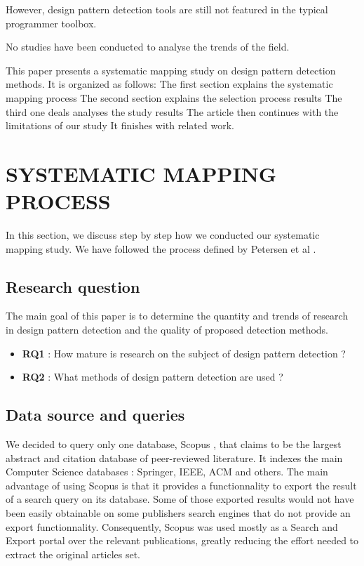 \documentclass[letterpaper, 10 pt, conference]{ieeeconf}  %
\begin{document}
However, design pattern detection tools are still not featured in the typical
programmer toolbox.

No studies have been conducted to analyse the trends of the field.

This paper presents a systematic mapping study on design pattern detection
methods.
It is organized as follows: 
 The first section explains the systematic mapping process
 The second section explains the selection process results
 The third one deals analyses the study results
 The article then continues with the limitations of our study
 It finishes with related work. 



\section{SYSTEMATIC MAPPING PROCESS}

In this section, we discuss step by step how we conducted our systematic
mapping study.
We have followed the process defined by Petersen et al \cite{c1}. 

\subsection{Research question}

The main goal of this paper is to determine the quantity and trends of research
in design pattern detection and the quality of proposed detection methods.

\begin{itemize}
	\item \textbf{RQ1} : How mature is research on the subject of design pattern detection ?
	\item \textbf{RQ2} : What methods of design pattern detection are used ?
\end{itemize}


\subsection{Data source and queries}

We decided to query only one database, Scopus \cite{c2}, that claims to be the
largest abstract and citation database of peer-reviewed literature.
It indexes the main Computer Science databases : Springer, IEEE, ACM and
others.
The main advantage of using Scopus is that it provides a functionnality to
export the result of a search query on its database.
Some of those exported results would not have been easily obtainable on some
publishers search engines that do not provide an export functionnality.
Consequently, Scopus was used mostly as a Search and Export portal over the
relevant publications, greatly reducing the effort needed to extract the
original articles set. 
\end{document}
